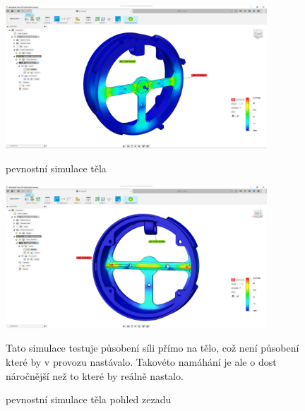 \begin{figure}[htbp]
    \centering
    \includegraphics[width=370]{kapitoly/obrazky/E4/machanika_tlakove_desky/simulace/F100N,primo,uprostred,pohled_zepredu.png}
    \caption{pevnostní simulace těla}
    \includegraphics[width=370]{kapitoly/obrazky/E4/machanika_tlakove_desky/simulace/F100N,primo,uprostred,pohled_zezadu.png}
    \caption{pevnostní simulace těla pohled zezadu}
    Tato simulace testuje působení síli přímo na tělo, což není působení které by v provozu nastávalo. Takovéto namáhání je ale o dost náročnější
    než to které by reálně nastalo.
    \label{fig:E4-simulace_tela}
\end{figure}

